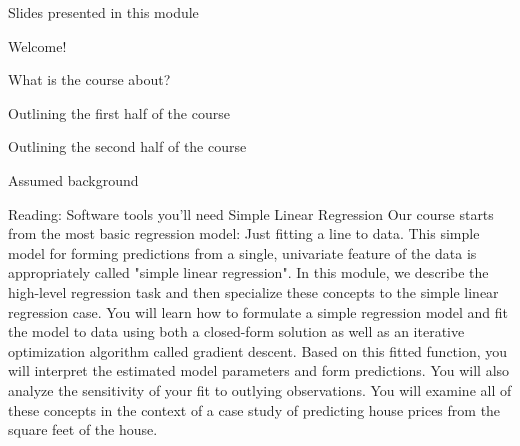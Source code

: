 \item Slides presented in this module
\item Welcome!
\item What is the course about?
\item Outlining the first half of the course
\item Outlining the second half of the course
\item Assumed background
\item Reading: Software tools you'll need
Simple Linear Regression
Our course starts from the most basic regression model: Just fitting a line to data. This simple model for forming predictions from a single, univariate feature of the data is appropriately called "simple linear regression".
In this module, we describe the high-level regression task and then specialize these concepts to the simple linear regression case. You will learn how to formulate a simple regression model and fit the model to data using both a closed-form solution as well as an iterative optimization algorithm called gradient descent. Based on this fitted function, you will interpret the estimated model parameters and form predictions. You will also analyze the sensitivity of your fit to outlying observations.
You will examine all of these concepts in the context of a case study of predicting house prices from the square feet of the house.
